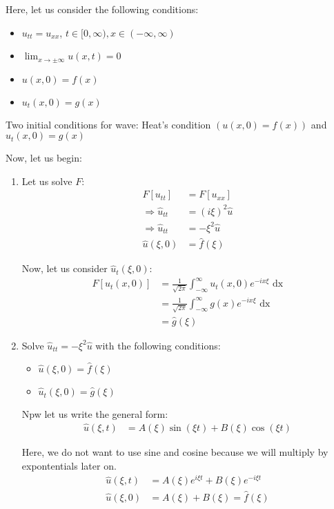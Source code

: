 \hrulefill


Here, let us consider the following conditions:
%
\begin{itemize}
  \item $u_{tt} = u_{xx}$, $t \in [0, \infty), x \in (-\infty, \infty)$
  \item $\displaystyle \lim_{x \to \pm \infty} u(x, t) = 0$
  \item $u(x, 0) = f(x)$
  \item $u_t(x, 0) = g(x)$
\end{itemize}

\note Two initial conditions for wave: Heat's condition $(u(x, 0) = f(x))$ and $u_t(x, 0) = g(x)$

Now, let us begin:
%
\begin{enumerate}
  \item Let us solve $F$:
  \begin{align}
    F[u_{tt}] & = F[u_{xx}]\\
    \Rightarrow \hat u_{tt} & = (i \xi)^2 \hat u\\
    \Rightarrow \hat u_{tt} & = - \xi^2 \hat u\\
    \hat u(\xi, 0) & = \hat f(\xi)
  \end{align}

  Now, let us consider $\hat u_t(\xi, 0)$:
  \begin{align}
    F[u_t(x, 0)] & = \frac{1}{\sqrt{2 \pi}} \int^\infty_{-\infty} u_t(x, 0) e^{-i x \xi} \text{ dx}\\
    & = \frac{1}{\sqrt{2 \pi}} \int^\infty_{-\infty} g(x) e^{-i x \xi} \text{ dx}\\
    & = \hat g(\xi)
  \end{align}

  \item Solve $\hat u_{tt} = -\xi^2 \hat u$ with the following conditions:
  \begin{itemize}
    \item $\hat u(\xi, 0) = \hat f(\xi)$
    \item $\hat u_t(\xi, 0) = \hat g(\xi)$
  \end{itemize}

  Npw let us write the general form:
  \begin{align}
    \hat u(\xi, t) & = A(\xi) \sin(\xi t) + B(\xi) \cos(\xi t)
  \end{align}

  Here, we do not want to use sine and cosine because we will multiply by expontentials later on.
  \begin{align}
    \hat u(\xi, t) & = A(\xi) e^{i \xi t} + B(\xi) e^{-i \xi t}\\
    \hat u(\xi, 0) & = A(\xi) + B(\xi) = \hat f(\xi)
  \end{align}
\end{enumerate}
